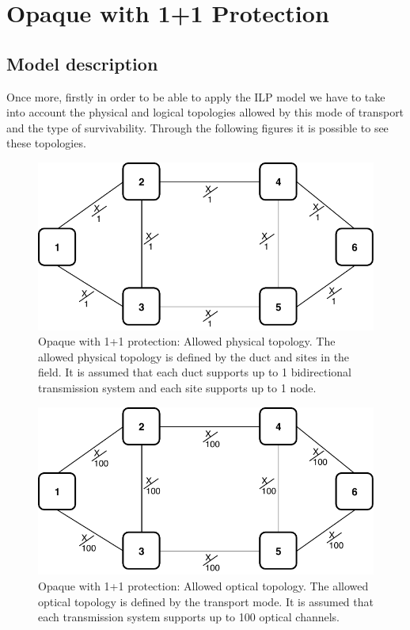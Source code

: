 \clearpage

\section{Opaque with 1+1 Protection}\label{ILP_Opaque_Protection}

\subsection{Model description}

Once more, firstly in order to be able to apply the ILP model we have to take into account the physical and logical topologies allowed by this mode of transport and the type of survivability. Through the following figures it is possible to see these topologies.\\

\begin{figure}[h!]
\centering
\includegraphics[width=12cm]{sdf/ilp/opaque_protection/figures/allowed_physical_topology}
\caption{Opaque with 1+1 protection: Allowed physical topology. The allowed physical topology is defined by the duct and sites in the field. It is assumed that each duct supports up to 1 bidirectional transmission system and each site supports up to 1 node.}
\label{allowed_physical_protectionlow}
\end{figure}

\vspace{13pt}
\begin{figure}[h!]
\centering
\includegraphics[width=12cm]{sdf/ilp/opaque_protection/figures/allowed_optical_topology}
\caption{Opaque with 1+1 protection: Allowed optical topology. The allowed optical topology is defined by the transport mode. It is assumed that each transmission system supports up to 100 optical channels.}
\label{allowed_optical_protectionlow}
\end{figure}

